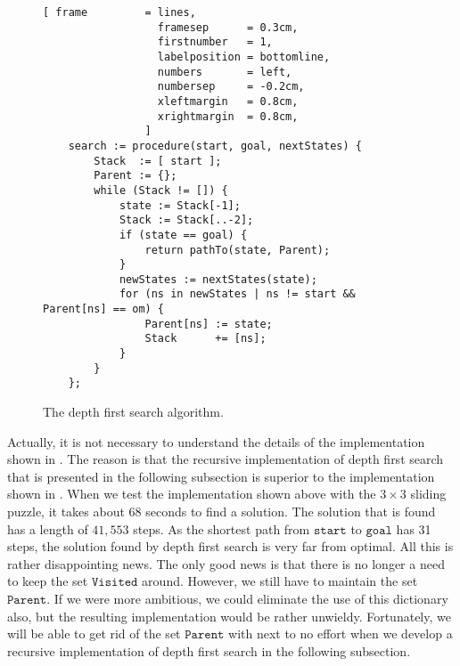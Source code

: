 \begin{figure}[!ht]
\centering
\begin{Verbatim}[ frame         = lines,
                  framesep      = 0.3cm,
                  firstnumber   = 1,
                  labelposition = bottomline,
                  numbers       = left,
                  numbersep     = -0.2cm,
                  xleftmargin   = 0.8cm,
                  xrightmargin  = 0.8cm,
                ]
    search := procedure(start, goal, nextStates) {
        Stack  := [ start ];
        Parent := {};
        while (Stack != []) {
            state := Stack[-1];
            Stack := Stack[..-2];
            if (state == goal) {
                return pathTo(state, Parent);
            }
            newStates := nextStates(state);
            for (ns in newStates | ns != start && Parent[ns] == om) {
                Parent[ns] := state;
                Stack      += [ns];
            }
        }
    };
\end{Verbatim}
\vspace*{-0.3cm}
\caption{The depth first search algorithm.}
\label{fig:depth-first-search.stlx}
\end{figure}
Actually, it is not necessary to understand the details of the implementation shown in
.  The reason is that the recursive implementation of depth first
search that is presented in the following subsection is superior to the implementation shown in
.
When we test the implementation shown above with the $3 \times 3$ sliding puzzle, it takes about 68 seconds to find a solution.
The solution that is found has a length of $41,553$ steps.  As the
shortest path from $\mathtt{start}$ to $\mathtt{goal}$ has 31 steps, the solution found by depth
first search is very far from optimal.  All this is rather disappointing news.  The only good news
is that there is no longer a need to keep the set $\mathtt{Visited}$ around.  However, we still have
to maintain the set $\mathtt{Parent}$.  If we were more ambitious, we could eliminate the use of
this dictionary also, but the resulting implementation would be rather unwieldy.  Fortunately, we will be
able to get rid of the set $\mathtt{Parent}$ with next to no effort when we develop a recursive
implementation of depth first search in the following subsection.

